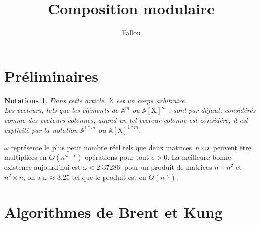 \documentclass[a4paper]{article}
\title{Composition modulaire}
\author{Fallou}
\begin{document}
\maketitle
\section{Préliminaires}
\newtheorem*{nt}{Notations}
\begin{nt}
Dans cette article, $\mathbb{K}$ est un corps arbitraire.
\\Les vecteurs, tels que les éléments de $\mathbb{A}^{m}$ ou $\mathbb{A}[\mathrm{X}]^{m}$ , sont par défaut, considérés comme des vecteurs colonnes; quand un tel vecteur colonne est considéré, il est explicité par la notation  $\mathbb{A}^{1*m}$ ou $\mathbb{A}[\mathrm{X}]^{1*m}$.
\end{nt}
$\omega$ représente le plus petit nombre réel tels que deux matrices $\textit{n}\times\textit{n}$ peuvent être multipliées en $O(\textit{n}^{\omega+\epsilon})$ opérations pour tout $\epsilon>0$. La meilleure bonne existence aujourd'hui est $\omega<2.37286$.  pour un produit de matrices $\textit{n}\times\textit{n}^{2}$ et $\textit{n}^{2}\times\textit{n}$, on a $\omega\approx3.25$ tel que le produit est en $O(\textit{n}^{\omega_{2}})$.
\section{Algorithmes de Brent et Kung}
\end{document}
